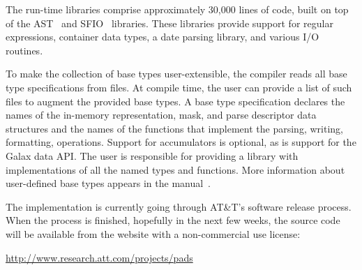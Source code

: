 \documentclass{sig-alternate}
\begin{document}
The \pads{} run-time libraries comprise approximately 30,000 lines of \C{} code, built on top of the AST~\cite{ast} and SFIO~\cite{sfio} libraries.
These libraries provide support for regular expressions, container data types, a date parsing library, and various I/O routines.  
 
To make the collection of base types user-extensible, the compiler reads all base type specifications from files.  
At compile time, the user can provide a list of such files to augment the provided base types.
A base type specification
declares the names of the in-memory representation, mask, and parse descriptor data structures and the names of the functions that implement the parsing, writing, formatting, \etc{} operations.  Support for accumulators is optional, as is support for the Galax data API.  The user is responsible for providing a \C{} library with implementations of all the named types and functions. 
More information about user-defined base types appears in the \pads{} manual~\cite{padsmanual}.

The \pads{} implementation is currently going through AT\&T's software
release process.  When the process is finished, hopefully in the next few weeks, the source code will be available from the \pads{} website with a non-commercial use license:
\begin{center}
\url{http://www.research.att.com/projects/pads}
\end{center}
 
\end{document}
